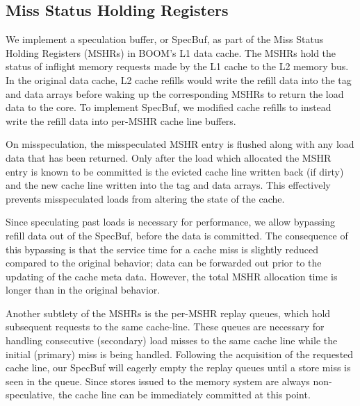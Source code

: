 \subsection{Miss Status Holding Registers}
We implement a speculation buffer, or SpecBuf, as part of the Miss Status Holding Registers (MSHRs) in BOOM's L1 data cache. The MSHRs hold the status of inflight memory requests made by the L1 cache to the L2 memory bus.
In the original data cache, L2 cache refills would write the refill data into the tag and data arrays before waking up the corresponding MSHRs to return the load data to the core.
To implement SpecBuf, we modified cache refills to instead write the refill data into per-MSHR cache line buffers.

On misspeculation, the misspeculated MSHR entry is flushed along with any load data that has been returned. Only after the load which allocated the MSHR entry is known to be committed is the evicted cache line written back (if dirty) and the new cache line written into the tag and data arrays. This effectively prevents misspeculated loads from altering the state of the cache.

Since speculating past loads is necessary for performance, we allow bypassing refill data out of the SpecBuf, before the data is committed. The consequence of this bypassing is that the service time for a cache miss is slightly reduced compared to the original behavior; data can be forwarded out prior to the updating of the cache meta data. However, the total MSHR allocation time is longer than in the original behavior.

Another subtlety of the MSHRs is the per-MSHR replay queues, which hold subsequent requests to the same cache-line. These queues are necessary for handling consecutive (secondary) load misses to the same cache line while the initial (primary) miss is being handled. Following the acquisition of the requested cache line, our SpecBuf will eagerly empty the replay queues until a store miss is seen in the queue. Since stores issued to the memory system are always non-speculative, the cache line can be immediately committed at this point.

